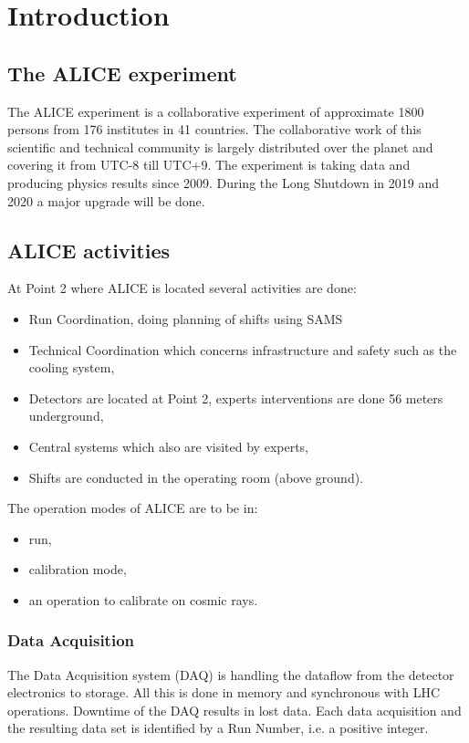 \chapter{Introduction}

\section{The ALICE experiment}
The ALICE experiment is a collaborative experiment of approximate 1800 persons from 176 institutes in 41 countries. The collaborative work of this scientific and technical community is largely distributed over the planet and covering it from UTC-8 till UTC+9. The experiment is taking data and producing physics results since 2009. During the Long Shutdown in 2019 and 2020 a major upgrade will be done. 

\section{ALICE activities}


At Point 2 where ALICE is located several activities are done:
\begin{itemize}
  \item Run Coordination, doing planning of shifts using SAMS
  \item Technical Coordination which concerns infrastructure and safety such as the cooling system,
  \item Detectors are located at Point 2, experts interventions are done 56 meters underground,
  \item Central systems which also are visited by experts,
  \item Shifts are conducted in the operating room (above ground).
\end{itemize}

The operation modes of ALICE are to be in:
\begin{itemize}
  \item run, 
  \item calibration mode,
  \item an operation to calibrate on cosmic rays.
\end{itemize} 


\subsection{Data Acquisition}
The Data Acquisition system (DAQ) is handling the dataflow from the detector electronics to storage. All this is done in memory and synchronous with LHC operations. Downtime of the DAQ results in lost data. Each data acquisition and the resulting data set is identified by a Run Number, i.e. a positive integer.

